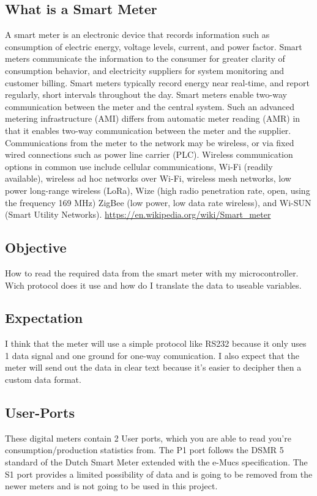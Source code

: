 \documentclass[a4paper,twoside, 12pt]{report}
\theoremstyle{break}
\begin{document}
\subsection{What is a Smart Meter}
A smart meter is an electronic device that records information such as consumption of electric energy, voltage levels, current, and power factor. Smart meters communicate the information to the consumer for greater clarity of consumption behavior, and electricity suppliers for system monitoring and customer billing. Smart meters typically record energy near real-time, and report regularly, short intervals throughout the day. Smart meters enable two-way communication between the meter and the central system. Such an advanced metering infrastructure (AMI) differs from automatic meter reading (AMR) in that it enables two-way communication between the meter and the supplier. Communications from the meter to the network may be wireless, or via fixed wired connections such as power line carrier (PLC). Wireless communication options in common use include cellular communications, Wi-Fi (readily available), wireless ad hoc networks over Wi-Fi, wireless mesh networks, low power long-range wireless (LoRa), Wize (high radio penetration rate, open, using the frequency 169 MHz) ZigBee (low power, low data rate wireless), and Wi-SUN (Smart Utility Networks).
\url{https://en.wikipedia.org/wiki/Smart_meter}

\eject

\subsection{Objective}
How to read the required data from the smart meter with my microcontroller. Wich protocol does it use and how do I translate the data to useable variables.

\subsection{Expectation}
I think that the meter will use a simple protocol like RS232 because it only uses 1 data signal and one ground for one-way comunication. I also expect that the meter will send out the data in clear text because it's easier to decipher then a custom data format.

\subsection{User-Ports}
These digital meters contain 2 User ports, which you are able to read you're consumption/production statistics from. The P1 port follows the DSMR 5 standard of the Dutch Smart Meter extended with the e-Mucs specification.
The S1 port provides a limited possibility of data and is going to be removed from the newer meters and is not going to be used in this project.
\end{document}
